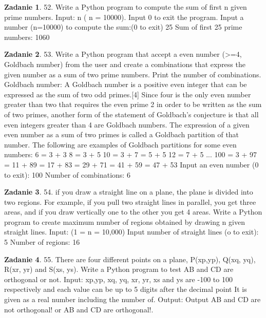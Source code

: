 \documentclass[11pt]{article}
\theoremstyle{definition}
\newtheorem{zadanie}{Zadanie}
\begin{document}
\begin{zadanie}


52. Write a Python program to compute the sum of first n given prime numbers. 
Input:
n ( n = 10000). Input 0 to exit the program.
Input a number (n=10000) to compute the sum:(0 to exit)
25
Sum of first 25 prime numbers:
1060

\end{zadanie}

\begin{zadanie}


53. Write a Python program that accept a even number (>=4, Goldbach number) from the user and create a combinations that express the given number as a sum of two prime numbers. Print the number of combinations. 
Goldbach number: A Goldbach number is a positive even integer that can be expressed as the sum of two odd primes.[4] Since four is the only even number greater than two that requires the even prime 2 in order to be written as the sum of two primes, another form of the statement of Goldbach's conjecture is that all even integers greater than 4 are Goldbach numbers.
The expression of a given even number as a sum of two primes is called a Goldbach partition of that number. The following are examples of Goldbach partitions for some even numbers:
6 = 3 + 3
8 = 3 + 5
10 = 3 + 7 = 5 + 5
12 = 7 + 5
...
100 = 3 + 97 = 11 + 89 = 17 + 83 = 29 + 71 = 41 + 59 = 47 + 53
Input an even number (0 to exit):
100
Number of combinations:
6

\end{zadanie}

\begin{zadanie}


54. if you draw a straight line on a plane, the plane is divided into two regions. For example, if you pull two straight lines in parallel, you get three areas, and if you draw vertically one to the other you get 4 areas.
Write a Python program to create maximum number of regions obtained by drawing n given straight lines. 
Input:
(1 = n = 10,000)
Input number of straight lines (o to exit):
5
Number of regions:
16

\end{zadanie}

\begin{zadanie}


55. There are four different points on a plane, P(xp,yp), Q(xq, yq), R(xr, yr) and S(xs, ys). Write a Python program to test AB and CD are orthogonal or not. 
Input:
xp,yp, xq, yq, xr, yr, xs and ys are -100 to 100 respectively and each value can be up to 5 digits after the decimal point It is given as a real number including the number of. Output:
Output AB and CD are not orthogonal! or AB and CD are orthogonal!.

\end{zadanie}
\end{document}

